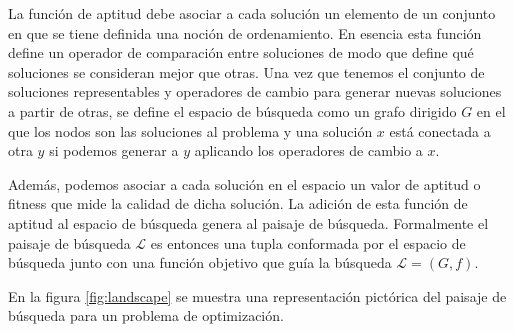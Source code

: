 La función de aptitud debe asociar a cada solución un elemento de un conjunto en que se tiene definida una noción de ordenamiento. 
%
En esencia esta función define un operador de comparación entre soluciones de modo que define qué soluciones se consideran mejor que otras.
%
Una vez que tenemos el conjunto de soluciones representables y operadores de cambio para generar nuevas soluciones a partir de otras, se define 
el espacio de búsqueda como un grafo dirigido $G$ en el que los nodos son las soluciones al problema y una solución $x$ está conectada a otra $y$ 
si podemos generar a $y$ aplicando los operadores de cambio a $x$.

Además, podemos asociar a cada solución en el espacio un valor de aptitud o fitness que mide la calidad de dicha solución. 
%
La adición de esta función de aptitud al espacio de búsqueda genera al paisaje de búsqueda. 
%
Formalmente el paisaje de búsqueda $\mathcal{L}$ es entonces una tupla conformada por el espacio de búsqueda junto con una función objetivo que 
guía la búsqueda $\mathcal{L}=(G,f)$.

En la figura \ref{fig:landscape} se muestra una representación pictórica del paisaje de búsqueda para un problema de optimización.

